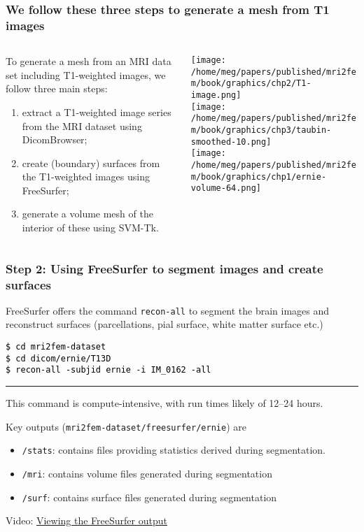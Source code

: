 \documentclass[10pt, mathserif, aspectratio=169, t, usenames, dvipsnames]{beamer}
\def\formtmpX#1#2{{\vskip3pt\noindent\fboxsep=0pt{\parbox{\textwidth}{\hbox to \textwidth{\hskip3pt\vbox{\raggedright\noindent\textbf{#2\vphantom{Qy}}}\hfill}}}\vskip3pt\par
\noindent\kern0pt}}
\newenvironment{programcode}[1]{\ignorespaces\def\stmtopen##1{##1}%
\formtmpX{programcode}{\centerline{\small{#1}}}}{\noindent\textcolor{programcode}{\rule{\columnwidth}{0pt}}\par\addvspace{\baselineskip}}%
\newcommand{\terminal}[1]{
  \vspace{-1em}
  \begin{programcode}{}%
    \colorbox{blue!10}{\parbox{0.98\textwidth}{\textcolor{black}{\texttt{#1}}}}
  \end{programcode}
  \vspace{-0.5em}
}
\newcommand{\emp}[1]{\texttt{#1}}
\begin{document}
\begin{frame}
\frametitle{We follow these three steps to generate a mesh from T1 images}

\begin{columns}[T]
\begin{column}{0.7\textwidth}
To generate a mesh from an MRI data set including T1-weighted images,
we follow three main steps:
\bigskip
\begin{enumerate}
\item
  extract a T1-weighted image series from the MRI dataset using DicomBrowser;
\item
  create (boundary) surfaces from the T1-weighted images using FreeSurfer;
\item 
  generate a volume mesh of the interior of these using SVM-Tk.
\end{enumerate}
\end{column}
\begin{column}{0.3\textwidth}
  \centering
  \texttt{[image: /home/meg/papers/published/mri2fem/book/graphics/chp2/T1-image.png]} \\
  \texttt{[image: /home/meg/papers/published/mri2fem/book/graphics/chp3/taubin-smoothed-10.png]} \\
  \texttt{[image: /home/meg/papers/published/mri2fem/book/graphics/chp1/ernie-volume-64.png]} \\
\end{column}
\end{columns}

\end{frame}


\begin{frame}
\frametitle{Step 2: Using FreeSurfer to segment images and create surfaces}

FreeSurfer offers the command \emp{recon-all} to segment the brain
images and reconstruct surfaces (parcellations, pial surface, white
matter surface etc.)

\terminal{\$ cd mri2fem-dataset \\
\$ cd dicom/ernie/T13D \\
\$ recon-all -subjid ernie -i IM\_0162 -all}

This command is compute-intensive, with run times likely of 12--24
hours.

Key outputs (\emp{mri2fem-dataset/freesurfer/ernie}) are 
\begin{itemize}
\item \emp{/stats}: contains files providing statistics derived during segmentation.
\item \emp{/mri}: contains volume files generated during segmentation
\item \emp{/surf}: contains surface files generated during segmentation
\end{itemize}

\medskip

\alert{Video: \href{https://youtu.be/Svz3kYfsCQo}{Viewing the FreeSurfer output}}
\end{frame}
\end{document}
